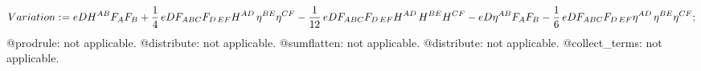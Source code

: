 \documentclass[11pt]{article}
\def\specialcolon{\mathrel{\mathop{:}}\hspace{-.5em}}
\begin{document}
\begin{dmath*}[compact, spread=2pt]
Variation\specialcolon{}= eD {H}^{A B} {F}_{A} {F}_{B} + \frac{1}{4}\, eD {F}_{A B C} {F}_{D\,  E F} {H}^{A D\, } {\eta}^{B E} {\eta}^{C F} - \frac{1}{12}\, eD {F}_{A B C} {F}_{D\,  E F} {H}^{A D\, } {H}^{B E} {H}^{C F} - eD {\eta}^{A B} {F}_{A} {F}_{B} - \frac{1}{6}\, eD {F}_{A B C} {F}_{D\,  E F} {\eta}^{A D\, } {\eta}^{B E} {\eta}^{C F};
\end{dmath*}
@prodrule: not applicable.
@distribute: not applicable.
@sumflatten: not applicable.
@distribute: not applicable.
@collect\_terms: not applicable.
\end{document}
